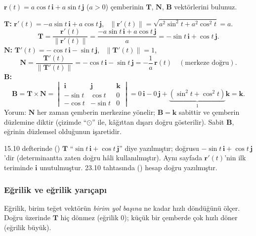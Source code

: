 \begin{soru}
$\mathbf r(t)=a\cos t\,\mathbf i+a\sin t\,\mathbf j$ ($a>0$) çemberinin $\mathbf T$, $\mathbf N$, $\mathbf B$ vektörlerini bulunuz.
\end{soru}
\begin{cevap}
\textbf{$\mathbf T$:} $\mathbf r'(t)=-a\sin t\,\mathbf i+a\cos t\,\mathbf j$, \ $\|\mathbf r'(t)\|=\sqrt{a^2\sin^2t+a^2\cos^2t}=a$.
\[ \mathbf T=\frac{\mathbf r'(t)}{\|\mathbf r'(t)\|}=\frac{-a\sin t\,\mathbf i+a\cos t\,\mathbf j}{a}=-\sin t\,\mathbf i+\cos t\,\mathbf j . \]
\textbf{$\mathbf N$:} $\mathbf T'(t)=-\cos t\,\mathbf i-\sin t\,\mathbf j$, \ $\|\mathbf T'(t)\|=1$,
\[ \mathbf N=\frac{\mathbf T'(t)}{\|\mathbf T'(t)\|}=-\cos t\,\mathbf i-\sin t\,\mathbf j=-\frac1a\,\mathbf r(t)\quad(\text{merkeze doğru}). \]
\textbf{$\mathbf B$:}
\[ \mathbf B=\mathbf T\times\mathbf N=\begin{vmatrix}\mathbf i&\mathbf j&\mathbf k\\-\sin t&\cos t&0\\-\cos t&-\sin t&0\end{vmatrix}
=0\,\mathbf i-0\,\mathbf j+\underbrace{(\sin^2t+\cos^2t)}_{1}\mathbf k=\boxed{\mathbf k} . \]
Yorum: $\mathbf N$ her zaman çemberin merkezine yönelir; $\mathbf B=\mathbf k$ sabittir ve çemberin düzlemine diktir (çizimde
``$\odot$'' ile, kâğıttan dışarı doğru gösterilir). Sabit $\mathbf B$, eğrinin düzlemsel olduğunun işaretidir.
\end{cevap}

\begin{bilgi}
15.10 defterinde () $\mathbf T$ ``$\sin t\,\mathbf i+\cos t\,\mathbf j$'' diye yazılmıştır; doğrusu
$-\sin t\,\mathbf i+\cos t\,\mathbf j$'dir (determinantta zaten doğru hâli kullanılmıştır). Aynı sayfada $\mathbf r'(t)$'nin ilk
teriminde $\mathbf i$ unutulmuştur. 23.10 tahtasında () hesap doğru yazılmıştır.
\end{bilgi}

\subsubsection{Eğrilik ve eğrilik yarıçapı}

Eğrilik, birim teğet vektörün \emph{birim yol başına} ne kadar hızlı döndüğünü ölçer. Doğru üzerinde $\mathbf T$ hiç dönmez
(eğrilik $0$); küçük bir çemberde çok hızlı döner (eğrilik büyük).

